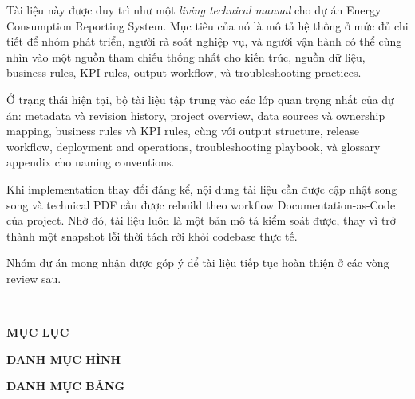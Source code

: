\documentclass[12pt,oneside,openany]{book}
\makeatletter
\numberwithin{equation}{chapter}
\newcommand{\ProjectName}{Energy Consumption Reporting System}
\newcommand{\DocumentOwnerLabel}{Tuyen Tran}
\renewcommand{\chaptername}{Chương}
\newcommand{\TieuDeTrang}[1]{%
	\begin{center}
		{\fontsize{15}{18}\selectfont\bfseries #1}
	\end{center}
	\vspace{10pt}
}
\renewcommand{\tableofcontents}{\@starttoc{toc}}
\renewcommand{\listoffigures}{\@starttoc{lof}}
\renewcommand{\listoftables}{\@starttoc{lot}}
\makeatother
\begin{document}
	\vspace{16pt}
	
	\noindent Tài liệu này được duy trì như một \textit{living technical manual} cho dự án \ProjectName. Mục tiêu của nó là mô tả hệ thống ở mức đủ chi tiết để nhóm phát triển, người rà soát nghiệp vụ, và người vận hành có thể cùng nhìn vào một nguồn tham chiếu thống nhất cho kiến trúc, nguồn dữ liệu, business rules, KPI rules, output workflow, và troubleshooting practices.
	
	\vspace{10pt}
	
	\noindent Ở trạng thái hiện tại, bộ tài liệu tập trung vào các lớp quan trọng nhất của dự án: metadata và revision history, project overview, data sources và ownership mapping, business rules và KPI rules, cùng với output structure, release workflow, deployment and operations, troubleshooting playbook, và glossary appendix cho naming conventions.
	
	\vspace{10pt}
	
	\noindent Khi implementation thay đổi đáng kể, nội dung tài liệu cần được cập nhật song song và technical PDF cần được rebuild theo workflow Documentation-as-Code của project. Nhờ đó, tài liệu luôn là một bản mô tả kiểm soát được, thay vì trở thành một snapshot lỗi thời tách rời khỏi codebase thực tế.
	
	\vspace{16pt}
	
	\noindent Nhóm dự án mong nhận được góp ý để tài liệu tiếp tục hoàn thiện ở các vòng review sau.
	
	\vspace{18pt}
	\noindent\makebox[0.9\textwidth][r]{\textbf{\DocumentOwnerLabel}}\\
	\noindent{}
	\clearpage
	
	\thispagestyle{empty}
	\TieuDeTrang{MỤC LỤC}
	\tableofcontents
	\clearpage
	
	\thispagestyle{empty}
	\TieuDeTrang{DANH MỤC HÌNH}
	\listoffigures
	\clearpage
	
	\thispagestyle{empty}
	\TieuDeTrang{DANH MỤC BẢNG}
	\listoftables
	\clearpage
	
	
	
	
	
	
	
	
	
	\appendix
	\renewcommand{\chaptername}{Phụ lục}
	
	
\end{document}
